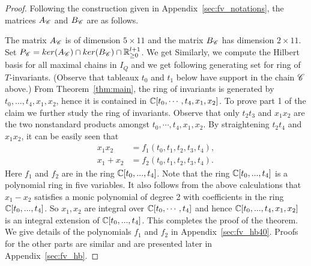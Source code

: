 \begin{proof}
 \unskip 
 Following the construction given in Appendix~\ref{sec:fv_notations}, the matrices \(A_{\mathscr{C}}\) and \(B_{\mathscr{C}}\) are as follows.

\unskip
    The matrix \(A_{\mathscr{C}}\) is of dimension \(5 \times 11 \) and the matrix \(B_{\mathscr{C}}\) has dimension \(2 \times 11\). 
Set \(P_{\mathscr{C}} = ker(A_{\mathscr{C}}) \cap ker(B_{\mathscr{C}}) \cap \mathbb{R}_{\ge 0}^{l+1}\). 
    We get 
\unskip
    Similarly, we compute the Hilbert basis for all maximal chains in \(I_{Q}\) and we get following generating set for ring of \(T\)-invariants. (Observe that tableaux \(t_0\) and \(t_1\) below have support in the chain \(\mathscr{C}\) above.)  
\unskip
    From Theorem~\ref{thm:main}, the ring of invariants is generated by \(t_0,...,t_4,x_1,x_2\), hence it is contained in \(\mathbb{C}[t_0,\cdots,t_4,x_1,x_2]\). 
    To prove part 1 of the claim we further study the ring of invariants. Observe that only \(t_2t_3\) and \(x_1x_2\) are the two nonstandard products amongst \(t_0,\cdots,t_4,x_1,x_2\).
    By straightening \(t_2t_4\) and \(x_1x_2\), it can be easily seen that
    \begin{align*}
        x_1x_2 &= f_1(t_0,t_1,t_2,t_3,t_4),\\ 
        x_1+x_2 &= f_2(t_0,t_1,t_2,t_3,t_4).
    \end{align*}
    Here $f_1$ and $f_2$ are in the ring \(\mathbb{C}[t_0,...,t_4]\).  Note that the ring \(\mathbb{C}[t_0,...,t_4]\) is a polynomial ring in five variables. It also follows from the above calculations that $x_1-x_2$ satisfies a monic polynomial of degree 2 with coefficients in the ring \(\mathbb{C}[t_0,...,t_4]\). So $x_1, x_2$ are integral over \(\mathbb{C}[t_0,\cdots,t_4]\) and hence \(\mathbb{C}[t_0,...,t_4,x_1,x_2]\) is an integral extension of \(\mathbb{C}[t_0,...,t_4]\). This completes the proof of the theorem.
We give details of the polynomials $f_1$ and $f_2$ in Appendix~\ref{sec:fv_hb40}. Proofs for the other parts are similar and are presented later in Appendix~\ref{sec:fv_hb}.

\end{proof}
